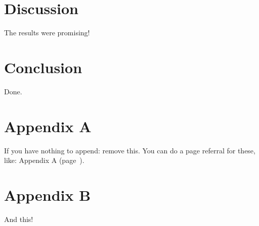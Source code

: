\documentclass[11pt, a4paper]{article}
\begin{document}
\section{Discussion}

The results were promising!

\section{Conclusion}

Done.



\section*{Appendix A} \label{app:a}

If you have nothing to append: remove this. You can do a page referral for these, like: Appendix A (page~\pageref{app:a}).

\section*{Appendix B}

And this!
\end{document}
